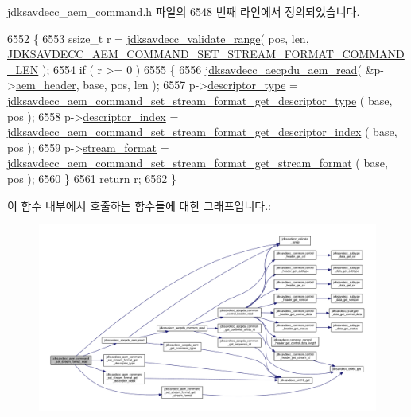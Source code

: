 jdksavdecc\+\_\+aem\+\_\+command.\+h 파일의 6548 번째 라인에서 정의되었습니다.


\begin{DoxyCode}
6552 \{
6553     ssize\_t r = \hyperlink{group__util_ga9c02bdfe76c69163647c3196db7a73a1}{jdksavdecc\_validate\_range}( pos, len, 
      \hyperlink{group__command__set__stream__format_ga54f70043611f17ce7ca3c27c68a02fa6}{JDKSAVDECC\_AEM\_COMMAND\_SET\_STREAM\_FORMAT\_COMMAND\_LEN} );
6554     \textcolor{keywordflow}{if} ( r >= 0 )
6555     \{
6556         \hyperlink{group__aecpdu__aem_gae2421015dcdce745b4f03832e12b4fb6}{jdksavdecc\_aecpdu\_aem\_read}( &p->\hyperlink{structjdksavdecc__aem__command__set__stream__format_ae1e77ccb75ff5021ad923221eab38294}{aem\_header}, base, pos, len );
6557         p->\hyperlink{structjdksavdecc__aem__command__set__stream__format_ab7c32b6c7131c13d4ea3b7ee2f09b78d}{descriptor\_type} = 
      \hyperlink{group__command__set__stream__format_ga50d425d359f8e2d68522525d21783cb4}{jdksavdecc\_aem\_command\_set\_stream\_format\_get\_descriptor\_type}
      ( base, pos );
6558         p->\hyperlink{structjdksavdecc__aem__command__set__stream__format_a042bbc76d835b82d27c1932431ee38d4}{descriptor\_index} = 
      \hyperlink{group__command__set__stream__format_gaa334a23ebba7bd3f2d5c193a2283c38e}{jdksavdecc\_aem\_command\_set\_stream\_format\_get\_descriptor\_index}
      ( base, pos );
6559         p->\hyperlink{structjdksavdecc__aem__command__set__stream__format_a77359be54ea386b1da66597746709ed0}{stream\_format} = 
      \hyperlink{group__command__set__stream__format_ga54974d0b8f7e1ee1922df3a65d2a44a7}{jdksavdecc\_aem\_command\_set\_stream\_format\_get\_stream\_format}
      ( base, pos );
6560     \}
6561     \textcolor{keywordflow}{return} r;
6562 \}
\end{DoxyCode}


이 함수 내부에서 호출하는 함수들에 대한 그래프입니다.\+:
\nopagebreak
\begin{figure}[H]
\begin{center}
\leavevmode
\includegraphics[width=350pt]{group__command__set__stream__format_ga22b543c1e08650d6b9655327a9fd53d9_cgraph}
\end{center}
\end{figure}


